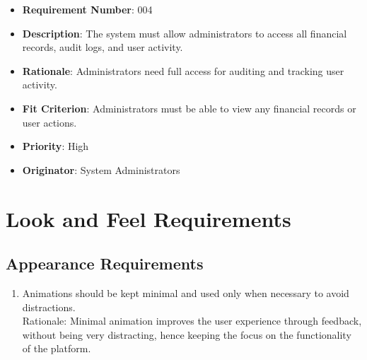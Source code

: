 \documentclass[12pt]{article}
\begin{document}
\begin{itemize}
  \bigskip

  \item \textbf{Requirement Number}: 004
  \item \textbf{Description}: The system must allow administrators to access all financial records, audit logs, and user activity.
  \item \textbf{Rationale}: Administrators need full access for auditing and tracking user activity.
  \item \textbf{Fit Criterion}: Administrators must be able to view any financial records or user actions.
  \item \textbf{Priority}: High
  \item \textbf{Originator}: System Administrators
  
  \bigskip

\end{itemize}

\section{Look and Feel Requirements}
\subsection{Appearance Requirements}
\begin{enumerate}
  \item  Animations should be kept minimal and used only when necessary to avoid distractions. \\
  Rationale: Minimal animation improves the user experience through feedback, without being very distracting, hence keeping the focus on the functionality of the platform.
\end{enumerate}
\end{document}
